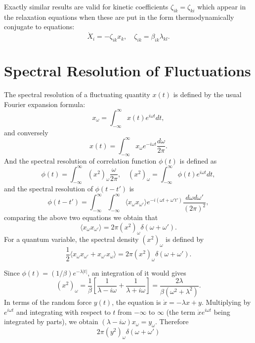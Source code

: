 \documentclass{book}
\newcommand{\average}[1]{\langle#1\rangle}
\numberwithin{equation}{section}
\begin{document}
Exactly similar results are valid for kinetic coefficients
$\zeta_{ik}=\zeta_{ki}$ which appear in the relaxation equations when these are
put in the form thermodynamically conjugate to equations:
\begin{equation}
  \dot{X}_i=-\zeta_{ik}x_k,\quad \zeta_{ik}=\beta_{ik}\lambda_{kl}.
\end{equation}

\section{Spectral Resolution of Fluctuations}
The spectral resolution of a fluctuating quantity $x(t)$ is defined by
the usual Fourier expansion formula:
\begin{equation}
  x_\omega=\int_{-\infty}^{\infty} x(t)e^{i\omega t}dt,
\end{equation}
and conversely 
\begin{equation}
  x(t)=\int_{-\infty}^{\infty}x_\omega e^{-i\omega t}\frac{d\omega}{2\pi}.
\end{equation}
And the spectral resolution of correlation function $\phi(t)$ is
defined as
\begin{equation}
  \phi(t)=\int_{-\infty}^{\infty}(x^2)_\omega\frac{\omega}{2\pi},\quad
  (x^2)_\omega=\int_{-\infty}^{\infty} \phi(t)e^{i\omega t}dt,
\end{equation}
and the spectral resolution of $\phi(t-t')$ is
\begin{equation}
  \phi(t-t')=\int_{-\infty}^{\infty}\int_{-\infty}^{\infty}\average{x_{\omega}x_{\omega'}}
  e^{-i(\omega t+\omega't')}\frac{d\omega d\omega'}{(2\pi)^2},
\end{equation}
comparing the above two equations we obtain that
\begin{equation}
  \average{x_{\omega}x_{\omega'}}=2\pi(x^2)_\omega\delta(\omega+\omega').
\end{equation}
For a quantum variable, the spectral density $(x^2)_\omega$ is defined by
\begin{equation}
  \frac{1}{2}\average{x_\omega x_{\omega'}+x_{\omega'}x_\omega}=
  2\pi(x^2)_\omega\delta(\omega+\omega').
\end{equation}

Since $\phi(t)=(1/\beta)e^{-\lambda|t|}$, an integration of it would gives
\begin{equation}
  (x^2)_\omega=\frac{1}{\beta}\left[\frac{1}{\lambda-i\omega}+
    \frac{1}{\lambda+i\omega}\right]=\frac{2\lambda}{\beta(\omega^2+\lambda^2)}.
\end{equation}
In terms of the random force $y(t)$, the equation is $\dot{x}=-\lambda
x+y$. Multiplying by $e^{i\omega t}$ and integrating with respect to
$t$ from $-\infty$ to $\infty$ (the term $\dot{x}e^{i\omega t}$ being
integrated by parts), we obtain
$(\lambda-i\omega)x_\omega=y_\omega$. Therefore
\begin{equation}
  2\pi(y^2)_\omega\delta(\omega+\omega')
\end{equation}
\end{document}
